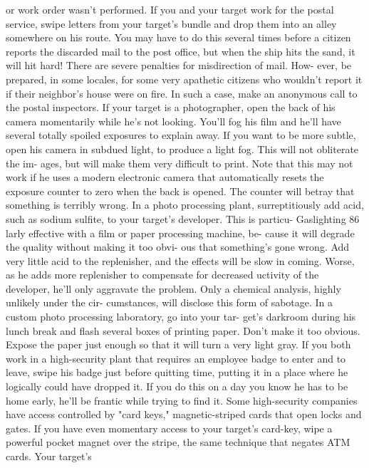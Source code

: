\documentclass{book}
\begin{document}
or work order wasn't performed. 
If you and your target work for the postal service, swipe 
letters from your target's bundle and drop them into an alley 
somewhere on his route. You may have to do this several 
times before a citizen reports the discarded mail to the post 
office, but when the ship hits the sand, it will hit hard! 
There are severe penalties for misdirection of mail. How- 
ever, be prepared, in some locales, for some very apathetic 
citizens who wouldn't report it if their neighbor's house 
were on fire. In such a case, make an anonymous call to the 
postal inspectors. 
If your target is a photographer, open the back of his camera 
momentarily while he's not looking. You'll fog his film and 
he'll have several totally spoiled exposures to explain away. 
If you want to be more subtle, open his camera in subdued 
light, to produce a light fog. This will not obliterate the im- 
ages, but will make them very difficult to print. Note that 
this may not work if he uses a modern electronic camera 
that automatically resets the exposure counter to zero when 
the back is opened. The counter will betray that something 
is terribly wrong. 
In a photo processing plant, surreptitiously add acid, such 
as sodium sulfite, to your target's developer. This is particu-  Gaslighting 
86 
larly effective with a film or paper processing machine, be- 
cause it will degrade the quality without making it too obvi- 
ous that something's gone wrong. Add very little acid to the 
replenisher, and the effects will be slow in coming. Worse, 
as he adds more replenisher to compensate for decreased 
uctivity of the developer, he'll only aggravate the problem. 
Only a chemical analysis, highly unlikely under the cir- 
cumstances, will disclose this form of sabotage. 
In a custom photo processing laboratory, go into your tar- 
get's darkroom during his lunch break and flash several 
boxes of printing paper. Don't make it too obvious. Expose 
the paper just enough so that it will turn a very light gray. 
If you both work in a high-security plant that requires an 
employee badge to enter and to leave, swipe his badge just 
before quitting time, putting it in a place where he logically 
could have dropped it. If you do this on a day you know he 
has to be home early, he'll be frantic while trying to find it. 
Some high-security companies have access controlled by 
"card keys," magnetic-striped cards that open locks and 
gates. If you have even momentary access to your target's 
card-key, wipe a powerful pocket magnet over the stripe, 
the same technique that negates ATM cards. Your target's 
\end{document}
